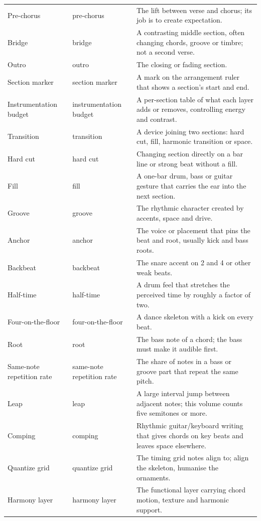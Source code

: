 \begin{longtable}{p{}p{}p{}}
Pre-chorus & pre-chorus & The lift between verse and chorus; its job is to create expectation. \\
Bridge & bridge & A contrasting middle section, often changing chords, groove or timbre; not a second verse. \\
Outro & outro & The closing or fading section. \\
Section marker & section marker & A mark on the arrangement ruler that shows a section's start and end. \\
Instrumentation budget & instrumentation budget & A per-section table of what each layer adds or removes, controlling energy and contrast. \\
Transition & transition & A device joining two sections: hard cut, fill, harmonic transition or space. \\
Hard cut & hard cut & Changing section directly on a bar line or strong beat without a fill. \\
Fill & fill & A one-bar drum, bass or guitar gesture that carries the ear into the next section. \\
Groove & groove & The rhythmic character created by accents, space and drive. \\
Anchor & anchor & The voice or placement that pins the beat and root, usually kick and bass roots. \\
Backbeat & backbeat & The snare accent on 2 and 4 or other weak beats. \\
Half-time & half-time & A drum feel that stretches the perceived time by roughly a factor of two. \\
Four-on-the-floor & four-on-the-floor & A dance skeleton with a kick on every beat. \\
Root & root & The bass note of a chord; the bass must make it audible first. \\
Same-note repetition rate & same-note repetition rate & The share of notes in a bass or groove part that repeat the same pitch. \\
Leap & leap & A large interval jump between adjacent notes; this volume counts five semitones or more. \\
Comping & comping & Rhythmic guitar/keyboard writing that gives chords on key beats and leaves space elsewhere. \\
Quantize grid & quantize grid & The timing grid notes align to; align the skeleton, humanise the ornaments. \\
Harmony layer & harmony layer & The functional layer carrying chord motion, texture and harmonic support. \\

\end{longtable}
